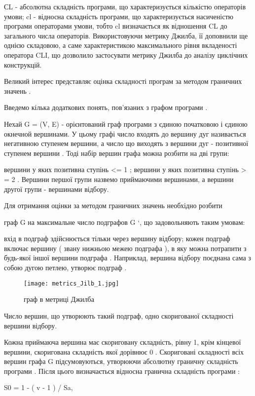 СL - абсолютна складність програми, що характеризується кількістю операторів умови;
cl - відносна складність програми, що характеризується насиченістю програми операторами умови, тобто cl визначається як відношення CL до загального числа операторів.
Використовуючи метрику Джилба, її доповнили ще однією складовою, а саме характеристикою максимального рівня вкладеності оператора CLI, що дозволило застосувати метрику Джилба до аналізу циклічних конструкцій.

Великий інтерес представляє оцінка складності програм за методом граничних значень .

Введемо кілька додаткових понять, пов'язаних з графом програми .

Нехай G = (V, E) - орієнтований граф програми з єдиною початковою і єдиною окнечной вершинами. У цьому графі число входять до вершину дуг називається негативною ступенем вершини, а число що виходять з вершини дуг - позитивної ступенем вершини . Тоді набір вершин графа можна розбити на дві групи:

вершини у яких позитивна ступінь \textless{}= 1 ;
вершини у яких позитивна ступінь \textgreater{} = 2 .
Вершини першої групи назвемо приймаючими вершинами, а вершини другої групи - вершинами відбору.

Для отримання оцінки за методом граничних значень необхідно розбити

граф G на максимальне число подграфов G `, що задовольняють таким умовам:

вхід в подграф здійснюється тільки через вершину відбору;
кожен подграф включає вершину ( звану нижньою межею подграфа ), в яку можна потрапити з будь-якої іншої вершини подграфа . Наприклад, вершина відбору поєднана сама з собою дугою петлею, утворює подграф .

\begin{figure}
    \centering
    \texttt{[image: metrics\_Jilb\_1.jpg]}
    \caption{граф в метриці Джилба}
    \label{fig:awesome_image}
\end{figure}

Число вершин, що утворюють такий подграф, одно скоригованої складності вершини відбору.

Кожна приймаюча вершина має скориговану складність, рівну 1, крім кінцевої вершини, скоригована складність якої дорівнює 0 . Скориговані складності всіх вершин графа G підсумовуються, утворюючи абсолютну граничну складність програми . Після цього визначається відносна гранична складність програми :

S0 = 1 - ( v - 1 ) / Sa,

